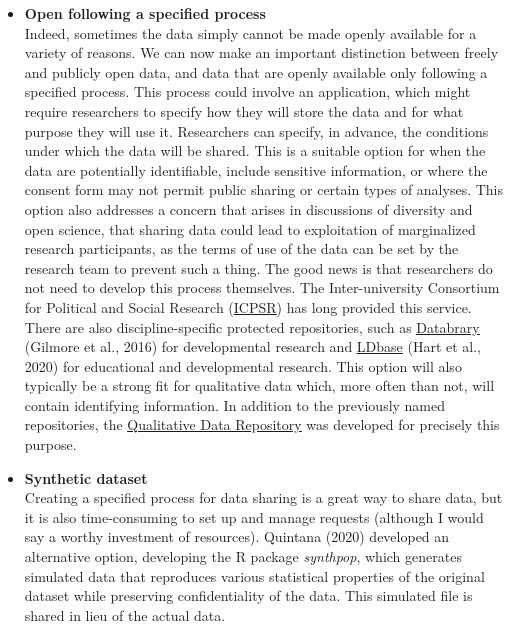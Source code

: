 \documentclass[authordate, empirical,issue]{jote-new-article}
\begin{document}
\begin{itemize}
  \item \textbf{Open following a specified process}\\
        Indeed, sometimes the data simply cannot be made openly available for a variety of reasons. We can now make an important distinction between freely and publicly open data, and data that are openly available only following a specified process. This process could involve an application, which might require researchers to specify how they will store the data and for what purpose they will use it. Researchers can specify, in advance, the conditions under which the data will be shared. This is a suitable option for when the data are potentially identifiable, include sensitive information, or where the consent form may not permit public sharing or certain types of analyses. This option also addresses a concern that arises in discussions of diversity and open science, that sharing data could lead to exploitation of marginalized research participants, as the terms of use of the data can be set by the research team to prevent such a thing. The good news is that researchers do not need to develop this process themselves. The Inter-university Consortium for Political and Social Research (\href{https://www.icpsr.umich.edu/web/pages/}{\underline{ICPSR}}) has long provided this service. There are also discipline-specific protected repositories, such as \href{https://nyu.databrary.org/}{\underline{Databrary}} (Gilmore et al., 2016) for developmental research and \href{https://ldbase.org/}{\underline{LDbase}} (Hart et al., 2020) for educational and developmental research. This option will also typically be a strong fit for qualitative data which, more often than not, will contain identifying information. In addition to the previously named repositories, the \href{https://qdr.syr.edu/}{\underline{Qualitative Data Repository}} was developed for precisely this purpose.







  \item \textbf{Synthetic dataset}
        \\ Creating a specified process for data sharing is a great way to share data, but it is also time-consuming to set up and manage requests (although I would say a worthy investment of resources). Quintana (2020) developed an alternative option, developing the R package \emph{synthpop}, which generates simulated data that reproduces various statistical properties of the original dataset while preserving confidentiality of the data. This simulated file is shared in lieu of the actual data.








\end{itemize}
\end{document}
